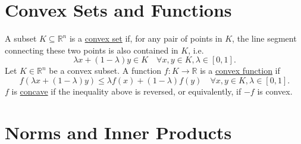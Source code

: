 \section{Convex Sets and Functions}

\begin{definition}[]
A subset $K \subseteq \mathbb{R}^n$ is a \underline{convex set} if, for any pair of points in $K$, the line 
segment connecting these two points is also contained in $K$, i.e. 
\[ \lambda x + (1 - \lambda) y \in K \quad \forall x, y \in K, \lambda \in [0, 1]. \]
Let $K \in \mathbb{R}^n$ be a convex subset. A function $f: K \to \mathbb{R}$ is a \underline{convex 
function} if 
\[ f(\lambda x + (1 - \lambda) y) \leq \lambda f(x) + (1 - \lambda) f(y) \quad \forall x, y \in K, 
\lambda \in [0, 1]. \]	
$f$ is \underline{concave} if the inequality above is reversed, or equivalently, if $-f$ is convex.
\end{definition}


\section*{Norms and Inner Products}

